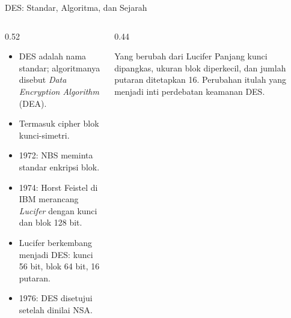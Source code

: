 \documentclass[aspectratio=169,11pt]{beamer}
\begin{document}
\begin{frame}{DES: Standar, Algoritma, dan Sejarah}
    \begin{columns}[T,onlytextwidth]
        \begin{column}{0.52\textwidth}
            \footnotesize
            \begin{itemize}
                \item DES adalah nama standar; algoritmanya disebut
                      \textit{Data Encryption Algorithm} (DEA).
                \item Termasuk cipher blok kunci-simetri.
                \item 1972: NBS meminta standar enkripsi blok.
                \item 1974: Horst Feistel di IBM merancang
                      \textit{Lucifer} dengan kunci dan blok 128 bit.
                \item Lucifer berkembang menjadi DES: kunci 56 bit, blok
                      64 bit, 16 putaran.
                \item 1976: DES disetujui setelah dinilai NSA.
            \end{itemize}
        \end{column}
        \begin{column}{0.44\textwidth}
            \begin{block}{Yang berubah dari Lucifer}
                \footnotesize
                Panjang kunci dipangkas, ukuran blok diperkecil, dan
                jumlah putaran ditetapkan 16. Perubahan itulah yang
                menjadi inti perdebatan keamanan DES.
            \end{block}
        \end{column}
    \end{columns}
\end{frame}
\end{document}
